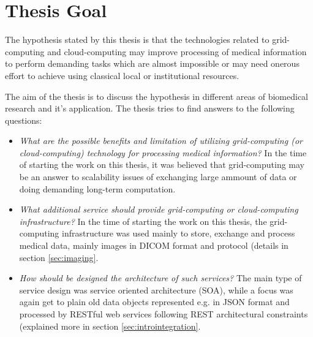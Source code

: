 \section{Thesis Goal}
The hypothesis stated by this thesis is that the technologies related to grid-computing and cloud-computing may improve processing of medical information to perform demanding tasks which are almost impossible or may need onerous effort to achieve using classical local or institutional resources.
 
The aim of the thesis is to discuss the hypothesis in different areas of biomedical research and it's application.
The thesis tries to find answers to the following questions:
\begin{itemize}
\item \emph{What are the possible benefits and limitation of utilizing grid-computing (or cloud-computing) technology for processing medical information?} In the time of starting the work on this thesis, it was believed that grid-computing may be an answer to scalability issues of exchanging large ammount of data or doing demanding long-term computation. %
\item \emph{What additional service should provide grid-computing or cloud-computing infrastructure?} In the time of starting the work on this thesis, the grid-computing infrastructure was used mainly to store, exchange and process medical data, mainly images in DICOM format and protocol (details in section \ref{sec:imaging}.
\item \emph{How should be designed the architecture of such services?} The main type of service design was service oriented architecture (SOA), while a focus was again get to plain old data objects represented e.g. in JSON format and processed by RESTful web services following REST architectural constraints (explained more in section \ref{sec:introintegration}.     

\end{itemize}
